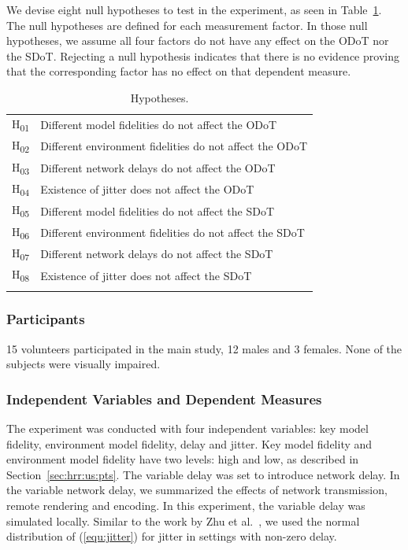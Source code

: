 We devise eight null hypotheses to test in the experiment, as seen in Table~\ref{tab:hypo}. The null hypotheses are defined for each measurement factor. In those null hypotheses, we assume all four factors do not have any effect on the ODoT nor the SDoT. Rejecting a null hypothesis indicates that there is no evidence proving that the corresponding factor has no effect on that dependent measure.

\begin{table}[!htbp]
\caption{Hypotheses.}
\label{tab:hypo}
\begin{tabular}{ll}
\noalign{\smallskip}\hline\noalign{\smallskip}
H\textsubscript{01} & Different model fidelities do not affect the ODoT \\
H\textsubscript{02} & Different environment fidelities do not affect the ODoT \\
H\textsubscript{03} & Different network delays do not affect the ODoT \\
H\textsubscript{04} & Existence of jitter does not affect the ODoT \\
H\textsubscript{05} & Different model fidelities do not affect the SDoT \\
H\textsubscript{06} & Different environment fidelities do not affect the SDoT \\
H\textsubscript{07} & Different network delays do not affect the SDoT \\
H\textsubscript{08} & Existence of jitter does not affect the SDoT \\
\noalign{\smallskip}\hline
\end{tabular}
\end{table}

\subsubsection{Participants}
\label{sec:hrr:us:ms:par}

15 volunteers participated in the main study, 12 males and 3 females. None of the subjects were visually impaired.

\subsubsection{Independent Variables and Dependent Measures}
\label{sec:hrr:us:ms:ivdm}

The experiment was conducted with four independent variables: key model fidelity, environment model fidelity, delay and jitter.
Key model fidelity and environment model fidelity have two levels: high and low, as described in Section~\ref{sec:hrr:us:pts}.
The variable delay was set to introduce network delay. In the variable network delay, we summarized the effects of network transmission, remote rendering and encoding. In this experiment, the variable delay was simulated locally. Similar to the work by Zhu et al.~\cite{zhu1998jitter}, we used the normal distribution of (\ref{equ:jitter}) for jitter in settings with non-zero delay.

